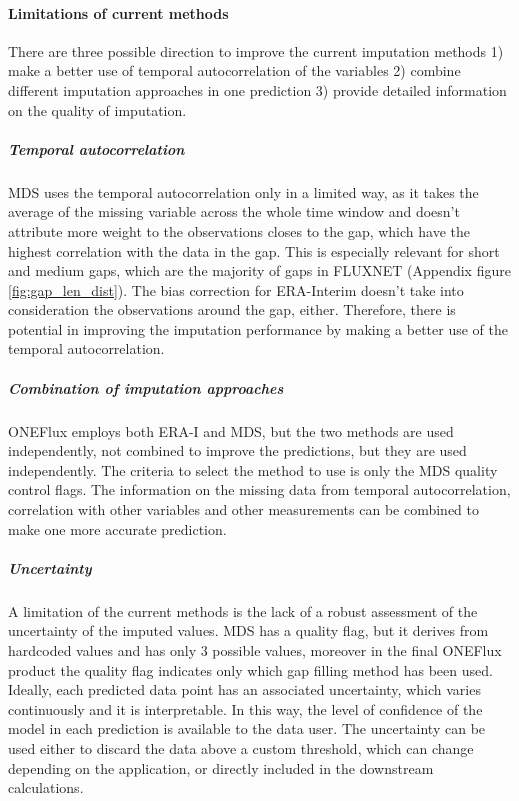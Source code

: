 \documentclass{article}
\begin{document}
\paragraph{Limitations of current methods} There are three possible direction to improve the current imputation methods  1) make a better use of temporal autocorrelation of the variables 2) combine different imputation approaches in one prediction  3) provide detailed information on the quality of imputation.

\subparagraph{Temporal autocorrelation} MDS uses the temporal autocorrelation only in a limited way, as it takes the average of the missing variable across the whole time window and doesn't attribute more weight to the observations closes to the gap, which have the highest correlation with the data in the gap. This is especially relevant for short and medium gaps, which are the majority of gaps in FLUXNET (Appendix figure \ref{fig:gap_len_dist}). The bias correction for ERA-Interim doesn't take into consideration the observations around the gap, either. Therefore, there is potential in improving the imputation performance by making a better use of the temporal autocorrelation.

\subparagraph{Combination of imputation approaches} ONEFlux employs both ERA-I and MDS, but the two methods are used independently, not combined to improve the predictions, but they are used independently. The criteria to select the method to use is only the MDS quality control flags. The information on the missing data from temporal autocorrelation, correlation with other variables and other measurements can be combined to make one more accurate prediction.

\subparagraph{Uncertainty} A limitation of the current methods is the lack of a robust assessment of the uncertainty of the imputed values. MDS has a quality flag, but it derives from hardcoded values and has only 3 possible values, moreover in the final ONEFlux product the quality flag indicates only which gap filling method has been used. Ideally, each predicted data point has an associated uncertainty, which varies continuously and it is interpretable. In this way, the level of confidence of the model in each prediction is available to the data user. The uncertainty can be used either to discard the data above a custom threshold, which can change depending on the application, or directly included in the downstream calculations.
\end{document}
